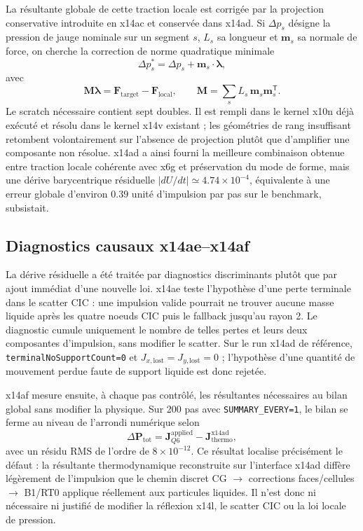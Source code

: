 \documentclass[11pt,a4paper]{article}
\begin{document}
La résultante globale de cette traction locale est corrigée par la projection conservative introduite en x14ac et conservée dans x14ad. Si $\Delta p_s$ désigne la pression de jauge nominale sur un segment $s$, $L_s$ sa longueur et $\bm m_s$ sa normale de force, on cherche la correction de norme quadratique minimale
\begin{equation}
  \Delta p_s^*=\Delta p_s+\bm m_s\cdot\bm\lambda,
\end{equation}
avec
\begin{equation}
  \bm M\bm\lambda=\bm F_{\mathrm{target}}-\bm F_{\mathrm{local}},
  \qquad
  \bm M=\sum_s L_s\,\bm m_s\bm m_s^{\mathsf T}.
  \label{eq:x14-resultant-projection}
\end{equation}
Le scratch nécessaire contient sept doubles. Il est rempli dans le kernel x10n déjà exécuté et résolu dans le kernel x14v existant ; les géométries de rang insuffisant retombent volontairement sur l'absence de projection plutôt que d'amplifier une composante non résolue. x14ad a ainsi fourni la meilleure combinaison obtenue entre traction locale cohérente avec x6g et préservation du mode de forme, mais une dérive barycentrique résiduelle $|dU/dt|\simeq4.74\times10^{-4}$, équivalente à une erreur globale d'environ $0.39$ unité d'impulsion par pas sur le benchmark, subsistait.

\subsection{Diagnostics causaux x14ae--x14af}

La dérive résiduelle a été traitée par diagnostics discriminants plutôt que par ajout immédiat d'une nouvelle loi. x14ae teste l'hypothèse d'une perte terminale dans le scatter CIC : une impulsion valide pourrait ne trouver aucune masse liquide après les quatre noeuds CIC puis le fallback jusqu'au rayon 2. Le diagnostic cumule uniquement le nombre de telles pertes et leurs deux composantes d'impulsion, sans modifier le scatter. Sur le run x14ad de référence, \texttt{terminalNoSupportCount=0} et $J_{x,\mathrm{lost}}=J_{y,\mathrm{lost}}=0$ ; l'hypothèse d'une quantité de mouvement perdue faute de support liquide est donc rejetée.

x14af mesure ensuite, à chaque pas contrôlé, les résultantes nécessaires au bilan global sans modifier la physique. Sur 200 pas avec \texttt{SUMMARY\_EVERY=1}, le bilan se ferme au niveau de l'arrondi numérique selon
\begin{equation}
  \Delta\bm P_{\mathrm{tot}}
  =\bm J_{Q6}^{\mathrm{applied}}-\bm J_{\mathrm{thermo}}^{\mathrm{x14ad}},
  \label{eq:x14af-balance}
\end{equation}
avec un résidu RMS de l'ordre de $8\times10^{-12}$. Ce résultat localise précisément le défaut : la résultante thermodynamique reconstruite sur l'interface x14ad diffère légèrement de l'impulsion que le chemin discret CG $\rightarrow$ corrections faces/cellules $\rightarrow$ B1/RT0 applique réellement aux particules liquides. Il n'est donc ni nécessaire ni justifié de modifier la réflexion x14l, le scatter CIC ou la loi locale de pression.
\end{document}
